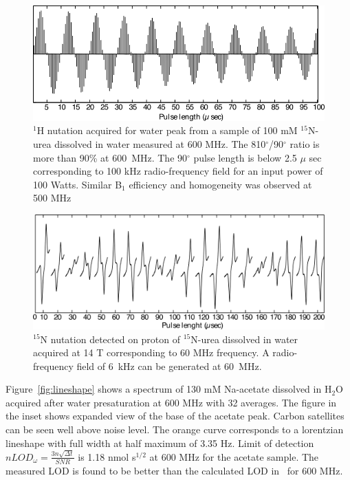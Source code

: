 \documentclass[preprint,12pt]{article}
\begin{document}
\begin{figure}
\centering
\includegraphics[width=\linewidth,keepaspectratio=true]{./figures/ms5n17-tlp-sp-150218-1-Hnutation-171216-103.png} 
\caption{$^1$H nutation acquired for water peak from a sample of 100 mM $^{15}$N-urea dissolved in water measured at 600 MHz. The 810$^{\circ}$/90$^{\circ}$ ratio is more than 90\% at 600~MHz. The 90$^{\circ}$ pulse length is below 2.5 $\mu$ sec corresponding to 100 kHz radio-frequency field for an input power of 100 Watts. Similar B$_{1}$ efficiency and homogeneity was observed at 500 MHz}
\label{fig:1H-nutation} 
\end{figure}
\begin{figure}
\centering
\includegraphics[width=\linewidth,keepaspectratio=true]{./figures/ms5n17-tlp-sp-150218-15-Nnutation-171215-003.png} 
\caption{$^{15}$N nutation detected on proton of $^{15}$N-urea dissolved in water acquired at 14 T corresponding to 60 MHz frequency. A radio-frequency field of 6~kHz can be generated at 60~MHz.}
\label{fig:15N-nutation} 
\end{figure}
Figure~\ref{fig:lineshape} shows a spectrum of 130 mM Na-acetate dissolved in H$_2$O acquired after water presaturation at 600 MHz with 32 averages. The figure in the inset shows expanded view of the base of the acetate peak. Carbon satellites can be seen well above noise level. The orange curve corresponds to a lorentzian lineshape with full width at half maximum of 3.35 Hz. Limit of detection $nLOD_{\omega}=\frac{3n\sqrt{{\Delta}t}}{SNR}$ is  1.18 nmol s$^{1/2}$ at 600 MHz for the acetate sample. The measured LOD is found to be better than the calculated LOD in~\cite{gream_2016} for 600 MHz.\par
\end{document}
